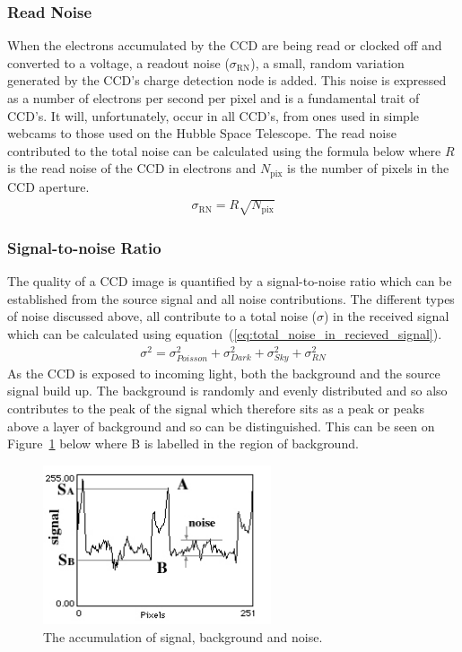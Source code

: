 		\subsubsection{Read Noise} %
		\label{ssub:read_noise}
			When the electrons accumulated by the CCD are being read or clocked off and converted to a voltage, a readout noise ($\sigma_\text{RN}$), a small, random variation generated by the CCD's charge detection node is added. This noise is expressed as a number of electrons per second per pixel and is a fundamental trait of CCD's. It will, unfortunately, occur in all CCD's, from ones used in simple webcams to those used on the Hubble Space Telescope\cite{Understanding_CCD_Read_Noise}. The read noise contributed to the total noise can be calculated using the formula below where $R$ is the read noise of the CCD in electrons and $N_\text{pix}$ is the number of pixels in the CCD aperture.
			\begin{align}
				\sigma_\text{RN} = R\sqrt{N_\text{pix}}
			\end{align}

		\subsubsection{Signal-to-noise Ratio} %
		\label{ssub:signal_to_noise_ratio}
			The quality of a CCD image is quantified by a signal-to-noise ratio which can be established from the source signal and all noise contributions. The different types of noise discussed above, all contribute to a total noise ($\sigma$) in the received signal which can be calculated using equation~(\ref{eq:total_noise_in_recieved_signal}).
			\begin{align}
				\sigma^{2} = \sigma_{Poisson}^{2} + \sigma_{Dark}^{2} + \sigma_{Sky}^{2} + \sigma_{RN}^{2} \label{eq:total_noise_in_recieved_signal}
			\end{align}
			As the CCD is exposed to incoming light, both the background and the source signal build up. The background is randomly and evenly distributed and so also contributes to the peak of the signal which therefore sits as a peak or peaks above a layer of background and so can be distinguished. This can be seen on Figure~\ref{fig:signal_noise_accumulation} below where B is labelled in the region of background\cite{Signal_to_Noise_Ratio}.
			\begin{figure}[htbp]
				\centering
				\includegraphics[width=0.6\textwidth]{../Images/SNR.png}
				\caption{The accumulation of signal, background and noise.\label{fig:signal_noise_accumulation}}
			\end{figure}

